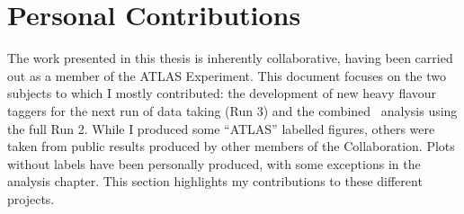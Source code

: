 \chapter*{\color{oxfordblue} Personal Contributions}

The work presented in this thesis is inherently collaborative, having been carried out as a member of the ATLAS Experiment. This document focuses on the two subjects to which I mostly contributed: the development of new heavy flavour taggers for the next run of data taking (Run 3) and the combined \vhbc\ analysis using the full Run 2. While I produced some ``ATLAS'' labelled figures, others were taken from public results produced by other members of the Collaboration. Plots without labels have been personally produced, with some exceptions in the analysis chapter. This section highlights my contributions to these different projects.

